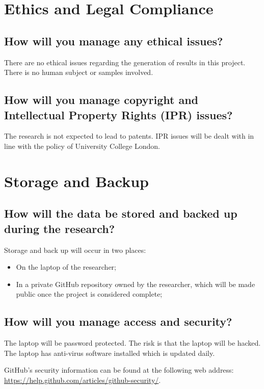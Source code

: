 \documentclass{article} %
\begin{document}
\section{Ethics and Legal Compliance}

\subsection{How will you manage any ethical issues?}

There are no ethical issues regarding the generation of results in this project. There is no human subject or samples involved.

\subsection{How will you manage copyright and Intellectual Property Rights (IPR) issues?}

The research is not expected to lead to patents. IPR issues will be dealt with in line with the policy of University College London.

\section{Storage and Backup}

\subsection{How will the data be stored and backed up during the research?}

Storage and back up will occur in two places:

\begin{itemize}
    \item On the laptop of the researcher;
    \item In a private GitHub repository owned by the researcher, which will be made public once the project is considered complete;
\end{itemize}

\subsection{How will you manage access and security?}

The laptop will be password protected. The risk is that the laptop will be hacked. The laptop has anti-virus software installed which is updated daily.

GitHub’s security information can be found at the following web address: \url{https://help.github.com/articles/github-security/}.
\end{document}

